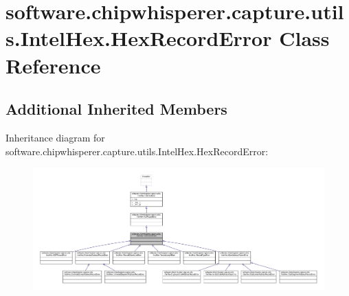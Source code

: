 \hypertarget{classsoftware_1_1chipwhisperer_1_1capture_1_1utils_1_1IntelHex_1_1HexRecordError}{}\section{software.\+chipwhisperer.\+capture.\+utils.\+Intel\+Hex.\+Hex\+Record\+Error Class Reference}
\label{classsoftware_1_1chipwhisperer_1_1capture_1_1utils_1_1IntelHex_1_1HexRecordError}
\subsection*{Additional Inherited Members}


Inheritance diagram for software.\+chipwhisperer.\+capture.\+utils.\+Intel\+Hex.\+Hex\+Record\+Error\+:\nopagebreak
\begin{figure}[H]
\begin{center}
\leavevmode
\includegraphics[width=350pt]{d8/d30/classsoftware_1_1chipwhisperer_1_1capture_1_1utils_1_1IntelHex_1_1HexRecordError__inherit__graph}
\end{center}
\end{figure}


